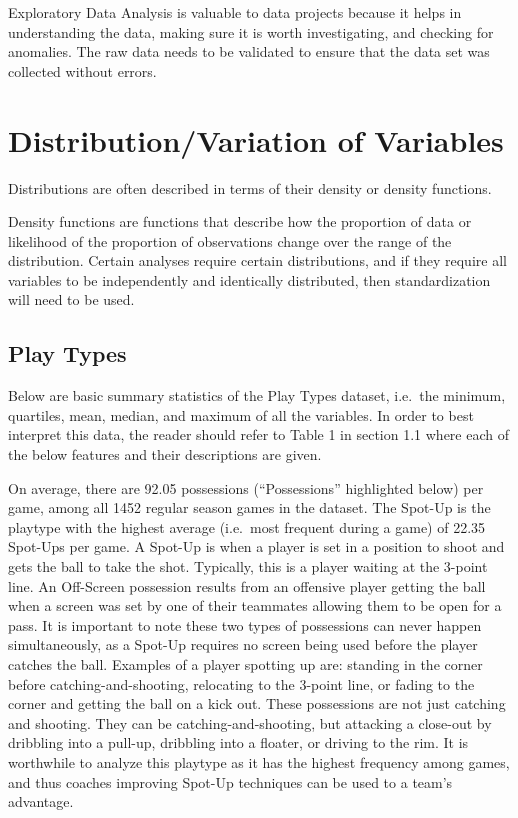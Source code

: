 \documentclass[]{book}
\begin{document}
Exploratory Data Analysis is valuable to data projects because it helps in understanding the data, making sure it is worth investigating, and checking for anomalies. The raw data needs to be validated to ensure that the data set was collected without errors.

\hypertarget{distributionvariation-of-variables}{%
\section{Distribution/Variation of Variables}\label{distributionvariation-of-variables}}

Distributions are often described in terms of their density or density functions.

Density functions are functions that describe how the proportion of data or likelihood of the proportion of observations change over the range of the distribution. Certain analyses require certain distributions, and if they require all variables to be independently and identically distributed, then standardization will need to be used.

\hypertarget{play-types-1}{%
\subsection{Play Types}\label{play-types-1}}

Below are basic summary statistics of the Play Types dataset, i.e.~the minimum, quartiles, mean, median, and maximum of all the variables. In order to best interpret this data, the reader should refer to Table 1 in section 1.1 where each of the below features and their descriptions are given.

On average, there are 92.05 possessions (``Possessions'' highlighted below) per game, among all 1452 regular season games in the dataset. The Spot-Up is the playtype with the highest average (i.e.~most frequent during a game) of 22.35 Spot-Ups per game. A Spot-Up is when a player is set in a position to shoot and gets the ball to take the shot. Typically, this is a player waiting at the 3-point line. An Off-Screen possession results from an offensive player getting the ball when a screen was set by one of their teammates allowing them to be open for a pass. It is important to note these two types of possessions can never happen simultaneously, as a Spot-Up requires no screen being used before the player catches the ball. Examples of a player spotting up are: standing in the corner before catching-and-shooting, relocating to the 3-point line, or fading to the corner and getting the ball on a kick out. These possessions are not just catching and shooting. They can be catching-and-shooting, but attacking a close-out by dribbling into a pull-up, dribbling into a floater, or driving to the rim. It is worthwhile to analyze this playtype as it has the highest frequency among games, and thus coaches improving Spot-Up techniques can be used to a team's advantage.
\end{document}
